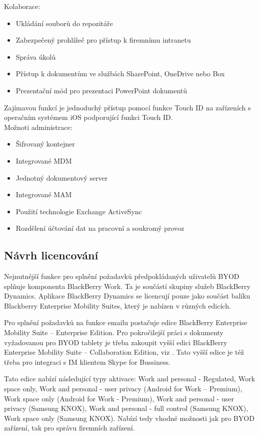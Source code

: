 Kolaborace:
\begin{itemize}
   \item Ukládání souborů do repozitáře
   \item Zabezpečený prohlížeč pro přístup k firemnímu intranetu
   \item Správa úkolů
   \item Přístup k dokumentům ve službách SharePoint, OneDrive nebo Box
   \item Prezentační mód pro prezentaci PowerPoint dokumentů
\end{itemize}

Zajímavou funkcí je jednoduchý přístup pomocí funkce Touch ID na zařízeních s operačním systémem iOS podporující funkci Touch ID.\\

Možnoti administrace:
\begin{itemize}
   \item Šifrovaný kontejner
   \item Integrované MDM
   \item Jednotný dokumentový server
   \item Integrované MAM
   \item Použití technologie Exchange ActiveSync
   \item Rozdělení účtování dat na pracovní a soukromý provoz
\end{itemize}

\subsection{Návrh licencování}

Nejnutnější funkce pro splnění požadavků předpokládaných uživatelů BYOD splňuje komponenta BlackBerry Work. Ta je součástí skupiny služeb BlackBerry Dynamics. Aplikace BlackBerry Dynamics se licencují pouze jako součást balíku Blackberry Enterprise Mobility Suites, který je nabízen v různých edicích.

Pro splnění požadavků na funkce emailu postačuje edice BlackBerry Enterprise Mobility Suite --  Enterprise Edition. Pro pokročilejší práci s dokumenty vyžadovanou pro BYOD tablety je třeba zakoupit vyšší edici BlackBerry Enterprise Mobility Suite -- Collaboration Edition, viz \cite{BBEMS}. Tato vyšší edice je též třeba pro integraci s IM klientem Skype for Bussiness.

Tato edice nabízí následující typy aktivace: Work and personal - Regulated, Work space only, Work and personal - user privacy (Android for Work -- Premium), Work space only (Android for Work - Premium), Work and personal - user privacy (Samsung KNOX), Work and personal - full control (Samsung KNOX), Work space only (Samsung KNOX). Nabízí tedy vhodné možnosti jak pro BYOD zařízení, tak pro správu firemních zařízení. 

